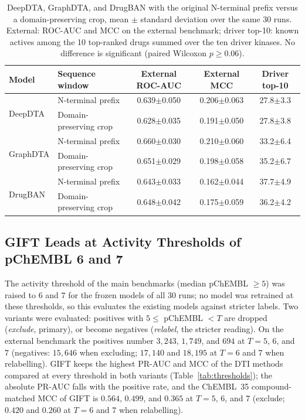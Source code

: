 \documentclass[11pt,letterpaper]{article}
\begin{document}
\begin{table}[!t]
\centering
\caption{DeepDTA, GraphDTA, and DrugBAN with the original N-terminal prefix versus a domain-preserving crop, mean $\pm$ standard deviation over the same 30 runs. External: ROC-AUC and MCC on the external benchmark; driver top-10: known actives among the 10 top-ranked drugs summed over the ten driver kinases. No difference is significant (paired Wilcoxon $p\geq0.06$).}
\label{tab:truncation}
\small
\begin{tabular}{llccc}
\toprule
\textbf{Model} & \textbf{Sequence window} & \textbf{External ROC-AUC} & \textbf{External MCC} & \textbf{Driver top-10} \\
\midrule
\multirow{2}{*}{DeepDTA}
 & N-terminal prefix & 0.639$\pm$0.050 & 0.206$\pm$0.063 & 27.8$\pm$3.3 \\
 & Domain-preserving crop & 0.628$\pm$0.035 & 0.191$\pm$0.050 & 27.8$\pm$3.8 \\
\midrule
\multirow{2}{*}{GraphDTA}
 & N-terminal prefix & 0.660$\pm$0.030 & 0.210$\pm$0.060 & 33.2$\pm$6.4 \\
 & Domain-preserving crop & 0.651$\pm$0.029 & 0.198$\pm$0.058 & 35.2$\pm$6.7 \\
\midrule
\multirow{2}{*}{DrugBAN}
 & N-terminal prefix & 0.643$\pm$0.033 & 0.162$\pm$0.044 & 37.7$\pm$4.9 \\
 & Domain-preserving crop & 0.648$\pm$0.042 & 0.175$\pm$0.059 & 36.2$\pm$4.2 \\
\bottomrule
\end{tabular}
\end{table}

\subsection{GIFT Leads at Activity Thresholds of pChEMBL 6 and 7}
\label{sec:thresholds}
The activity threshold of the main benchmarks (median pChEMBL $\geq5$) was raised to $6$ and $7$ for the frozen models of all 30 runs; no model was retrained at these thresholds, so this evaluates the existing models against stricter labels. Two variants were evaluated: positives with $5\leq$ pChEMBL $<T$ are dropped (\emph{exclude}, primary), or become negatives (\emph{relabel}, the stricter reading). On the external benchmark the positives number $3{,}243$, $1{,}749$, and $694$ at $T=5$, $6$, and $7$ (negatives: $15{,}646$ when excluding; $17{,}140$ and $18{,}195$ at $T=6$ and $7$ when relabelling). GIFT keeps the highest PR-AUC and MCC of the DTI methods compared at every threshold in both variants (Table~\ref{tab:thresholds}); the absolute PR-AUC falls with the positive rate, and the ChEMBL~35 compound-matched MCC of GIFT is $0.564$, $0.499$, and $0.365$ at $T=5$, $6$, and $7$ (exclude; $0.420$ and $0.260$ at $T=6$ and $7$ when relabelling).
\end{document}

